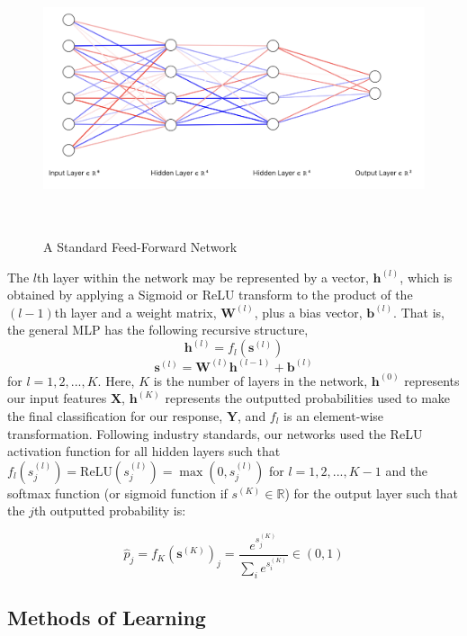 \documentclass [MAS] {uclathes}
\begin{document}
\begin{figure}[h]
\centering
\includegraphics[height = 80mm, width=130mm]{imgs/ffn.png}
\caption{A Standard Feed-Forward Network}
\label{fig:ffn}
\end{figure}

The $l$th layer within the network may be represented by a vector, $\mathbf{h}^{(l)}$, which is obtained by applying a Sigmoid or ReLU transform to the product of the $(l-1)$th layer and a weight matrix, $\mathbf{W}^{(l)}$, plus a bias vector, $\mathbf{b}^{(l)}$. That is, the general MLP has the following recursive structure, $$\mathbf{h}^{(l)} = f_l(\mathbf{s}^{(l)})$$
$$\mathbf{s}^{(l)} = \mathbf{W}^{(l)}\mathbf{h}^{(l-1)} + \mathbf{b}^{(l)}$$ for $l=1, 2, ..., K$. Here, $K$ is the number of layers in the network, $\mathbf{h}^{(0)}$ represents our input features $\mathbf{X}$, $\mathbf{h}^{(K)}$ represents the outputted probabilities used to make the final classification for our response, $\mathbf{Y}$, and $f_l$ is an element-wise transformation. Following industry standards, our networks used the ReLU activation function for all hidden layers such that $f_l(s^{(l)}_j) = \text{ReLU}(s^{(l)}_j) = \max(0, s^{(l)}_j)$ for $l=1, 2, ..., K-1$ and the softmax function (or sigmoid function if $s^{(K)} \in \mathbb{R}$) for the output layer such that the $j$th outputted probability is:

$$\hat{p}_j = f_K(\mathbf{s}^{(K)})_j = \frac{e^{s^{(K)}_j}}{\sum_i e^{s^{(K)}_i}} \in (0, 1)$$

\subsection{Methods of Learning}
\end{document}
